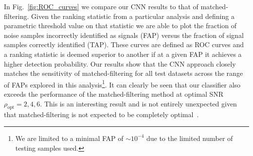 %
%
In Fig.~\ref{fig:ROC_curves} we compare our \ac{CNN} results to that 
of matched-filtering. Given the ranking statistic from a particular 
analysis and defining a parametric threshold value on that statistic 
we are able to plot the fraction of noise samples incorrectly 
identified as signals (\ac{FAP}) versus the fraction of signal 
samples correctly identified (\ac{TAP}). These curves are defined 
as \ac{ROC} curves and a ranking statistic is deemed superior to 
another if at a given \ac{FAP} it achieves a higher detection 
probability. Our results show that the \ac{CNN} approach closely 
matches the sensitivity of matched-filtering for all test 
datasets across the range of \ac{FAP}s explored in this 
analysis\footnote{We are limited to a minimal \ac{FAP} of 
$\sim 10^{-4}$ due to the limited number of 
testing samples used.}. 
It can clearly be seen that our classifier also exceeds the 
performance of the matched-filtering method at optimal 
\ac{SNR} $\rho_{\mathrm{opt}}=2,4,6$. This is an interesting result 
and is not entirely unexpected given that matched-filtering is not 
expected to be completely
optimal~\cite{2008arXiv0804.1161S,2021arXiv210403961Y}.

